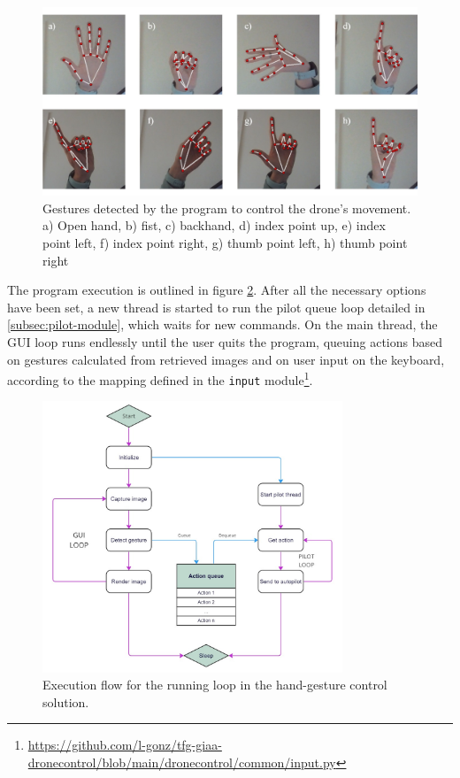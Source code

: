 \begin{figure}
  \centering
  \includegraphics[width=\textwidth, keepaspectratio]{img/hand-gestures.jpg}
  \caption{Gestures detected by the program to control the drone's movement. a) Open hand, b) fist, c) backhand, d) index point up, e) index point left, f) index point right, g) thumb point left, h) thumb point right}
  \label{fig:hand-gestures}
\end{figure}


The program execution is outlined in figure \ref{fig:hands-loop}.
After all the necessary options have been set, a new thread is started to run the pilot queue loop detailed in \ref{subsec:pilot-module}, which waits for new commands.
On the main thread, the GUI loop runs endlessly until the user quits the program, queuing actions based on gestures calculated from retrieved images and on user input on the keyboard, according to the mapping defined in the \texttt{input} module\footnote{\url{https://github.com/l-gonz/tfg-giaa-dronecontrol/blob/main/dronecontrol/common/input.py}}.

\begin{figure}
  \centering
  \includegraphics[width=0.8\textwidth, keepaspectratio]{img/hand-loop.jpg}
  \caption{Execution flow for the running loop in the hand-gesture control solution.}
  \label{fig:hands-loop}
\end{figure}

